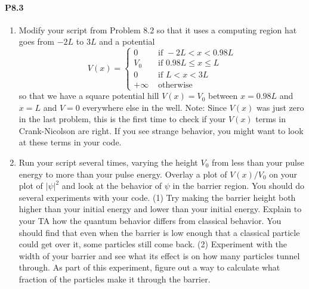 \paragraph*{P8.3}
\begin{enumerate}[label=(\alph*)]
	\item Modify your script from Problem 8.2 so that it uses a computing region hat goes from $-2L$ to $3L$ and a potential
\begin{equation}\label{eq:89}
V(x)= \begin{cases}0 & \text { if }-2 L<x<0.98 L \\ V_{0} & \text { if } 0.98 L \leq x \leq L \\ 0 & \text { if } L<x<3 L \\ +\infty & \text { otherwise }\end{cases}
\end{equation}
so that we have a square potential hill $V(x) = V_0$ between $x = 0.98L$ and $x = L$ and $V = 0$ everywhere else in the well.
Note: Since $V(x)$ was just zero in the last problem, this is the first time
to check if your $V(x)$ terms in Crank-Nicolson are right. If you see
strange behavior, you might want to look at these terms in your code.
\item Run your script several times, varying the height $V_0$ from less than your pulse energy to more than your pulse energy. Overlay a plot
of $V(x)/V_0$ on your plot of $ \vert \psi\vert^2$ and look at the behavior of $\psi$ in the barrier region. You should do several experiments with your code. (1) Try making
the barrier height both higher than your initial energy and lower than
your initial energy. Explain to your TA how the quantum behavior
differs from classical behavior. You should find that even when the
barrier is low enough that a classical particle could get over it, some
particles still come back. (2) Experiment with the width of your barrier
and see what its effect is on how many particles tunnel through. As
part of this experiment, figure out a way to calculate what fraction of
the particles make it through the barrier.

\end{enumerate}